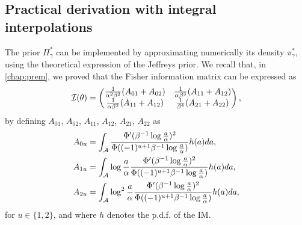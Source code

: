 



\subsection{Practical derivation with integral interpolations}\label{sec:constr-frags:subsec-practical-interpol}


The prior $\varPi_\gamma^\ast$ can be implemented by approximating numerically its density $\pi^\ast_\gamma$, using the theoretical expression of the Jeffreys prior.
We recall that, in   \cref{chap:prem}, we proved that %
the Fisher information matrix can be expressed as 
\begin{equation}
        \mathcal{I}(\theta)=\begin{pmatrix}
        \frac{1}{\alpha^2\beta^2}(A_{01} + A_{02}) & \frac{1}{\alpha\beta^3}(A_{11}+A_{12}) \\
        \frac{1}{\alpha\beta^3}(A_{11}+A_{12}) & \frac{1}{\beta^4}(A_{21}+A_{22})
    \end{pmatrix},
    \end{equation}
by defining 
$A_{01}$, $A_{02}$, $A_{11}$, $A_{12}$, $A_{21}$, $A_{22}$ as
    \begin{equation} %
    \begin{aligned}
        A_{0u} &= \int_\cA\frac{\Phi'(\beta^{-1}\log\frac{a}{\alpha})^2}{\Phi((-1)^{u+1}\beta^{-1}\log\frac{a}{\alpha})}h(a)da,\\
        A_{1u} &= \int_\cA\log\frac{a}{\alpha}\frac{\Phi'(\beta^{-1}\log\frac{a}{\alpha})^2}{\Phi((-1)^{u+1}\beta^{-1}\log\frac{a}{\alpha})}h(a)da,\\
        A_{2u} &= \int_\cA\log^2\frac{a}{\alpha}\frac{\Phi'(\beta^{-1}\log\frac{a}{\alpha})^2}{\Phi((-1)^{u+1}\beta^{-1}\log\frac{a}{\alpha})}h(a)da,
    \end{aligned}
    \end{equation}
for $u\in\{1,2\}$, and where $h$ denotes the p.d.f. of the IM.

